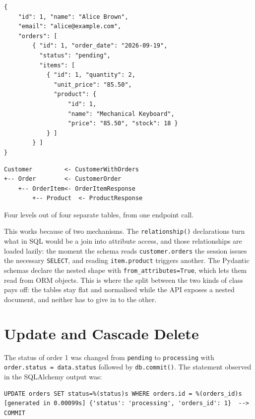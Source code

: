 \documentclass[10pt,a4paper]{article}
\begin{document}
\noindent
\begin{minipage}[t]{0.54\textwidth}
\begin{lstlisting}[style=plain]
{
    "id": 1, "name": "Alice Brown",
    "email": "alice@example.com",
    "orders": [
        { "id": 1, "order_date": "2026-09-19",
          "status": "pending",
          "items": [
            { "id": 1, "quantity": 2,
              "unit_price": "85.50",
              "product": {
                  "id": 1,
                  "name": "Mechanical Keyboard",
                  "price": "85.50", "stock": 18 }
            } ]
        } ]
}
\end{lstlisting}
\end{minipage}\hfill
\begin{minipage}[t]{0.43\textwidth}
\vspace{0.2cm}
\begin{lstlisting}[style=plain]
Customer         <- CustomerWithOrders
+-- Order        <- CustomerOrder
    +-- OrderItem<- OrderItemResponse
        +-- Product  <- ProductResponse
\end{lstlisting}
\footnotesize
Four levels out of four separate tables, from one endpoint call.
\normalsize
\end{minipage}

This works because of two mechanisms. The \texttt{relationship()} declarations
turn what in SQL would be a join into attribute access, and those relationships
are loaded lazily: the moment the schema reads \texttt{customer.orders} the
session issues the necessary \texttt{SELECT}, and reading \texttt{item.product}
triggers another. The Pydantic schemas declare the nested shape with
\texttt{from\_attributes=True}, which lets them read from ORM objects. This is
where the split between the two kinds of class pays off: the tables stay flat
and normalised while the API exposes a nested document, and neither has to give
in to the other.

\section{Update and Cascade Delete}

The status of order 1 was changed from \texttt{pending} to \texttt{processing}
with \texttt{order.status = data.status} followed by \texttt{db.commit()}. The
statement observed in the SQLAlchemy output was:

\begin{lstlisting}[style=sql]
UPDATE orders SET status=%(status)s WHERE orders.id = %(orders_id)s
[generated in 0.00099s] {'status': 'processing', 'orders_id': 1}  -->  COMMIT
\end{lstlisting}
\end{document}
